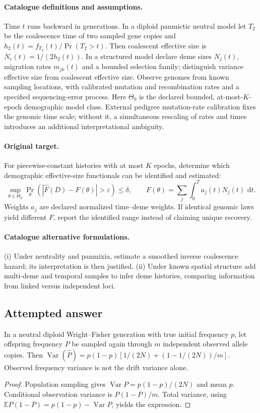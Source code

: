 \documentclass[11pt]{article}
\begin{document}
\paragraph{Catalogue definitions and assumptions.}
Time $t$ runs backward in generations. In a diploid panmictic neutral model let $T_2$ be the coalescence time of two sampled gene copies and $h_2(t)=f_{T_2}(t)/\Pr(T_2>t)$. Then coalescent effective size is $N_e(t)=1/(2h_2(t))$. In a structured model declare deme sizes $N_j(t)$, migration rates $m_{jk}(t)$ and a bounded selection family; distinguish variance effective size from coalescent effective size. Observe genomes from known sampling locations, with calibrated mutation and recombination rates and a specified sequencing-error process. Here $\Theta_0$ is the declared bounded, at-most-$K$-epoch demographic model class. External pedigree mutation-rate calibration fixes the genomic time scale; without it, a simultaneous rescaling of rates and times introduces an additional interpretational ambiguity.
\paragraph{Original target.}
For piecewise-constant histories with at most $K$ epochs, determine which demographic effective-size functionals can be identified and estimated:
\[
 \sup_{\theta\in\Theta_0}\Pr_\theta\!\left(
 |\widehat F(D)-F(\theta)|>\varepsilon\right)\le\delta,
 \qquad F(\theta)=\sum_j\int_0^T a_j(t)N_j(t)\,\,\mathrm{d} t.
\]
Weights $a_j$ are declared normalized time--deme weights. If identical genomic laws yield different $F$, report the identified range instead of claiming unique recovery.
\paragraph{Catalogue alternative formulations.}
(i) Under neutrality and panmixia, estimate a smoothed inverse coalescence hazard; its interpretation is then justified. (ii) Under known spatial structure add multi-deme and temporal samples to infer deme histories, comparing information from linked versus independent loci.
\subsection{Attempted answer}
\begin{proposition}
In a neutral diploid Wright--Fisher generation with true initial frequency $p$, let offspring frequency $P$ be sampled again through $m$ independent observed allele copies. Then $\operatorname{Var}(\widehat P)=p(1-p)[1/(2N)+(1-1/(2N))/m]$. Observed frequency variance is not the drift variance alone.
\end{proposition}
\begin{proof}
Population sampling gives $\operatorname{Var} P=p(1-p)/(2N)$ and mean $p$. Conditional observation variance is $P(1-P)/m$. Total variance, using $\mathbb{E} P(1-P)=p(1-p)-\operatorname{Var} P$, yields the expression.
\end{proof}
\end{document}
